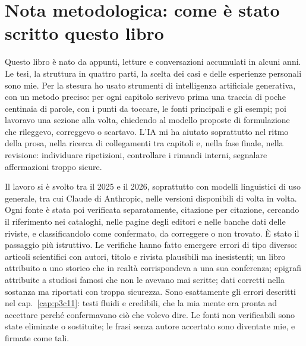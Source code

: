 
\chapter*{Nota metodologica: come è stato scritto questo libro}

Questo libro è nato da appunti, letture e conversazioni accumulati in alcuni anni. Le tesi, la struttura in quattro parti, la scelta dei casi e delle esperienze personali sono mie. Per la stesura ho usato strumenti di intelligenza artificiale generativa, con un metodo preciso: per ogni capitolo scrivevo prima una traccia di poche centinaia di parole, con i punti da toccare, le fonti principali e gli esempi; poi lavoravo una sezione alla volta, chiedendo al modello proposte di formulazione che rileggevo, correggevo o scartavo. L'IA mi ha aiutato soprattutto nel ritmo della prosa, nella ricerca di collegamenti tra capitoli e, nella fase finale, nella revisione: individuare ripetizioni, controllare i rimandi interni, segnalare affermazioni troppo sicure.

Il lavoro si è svolto tra il 2025 e il 2026, soprattutto con modelli linguistici di uso generale, tra cui Claude di Anthropic, nelle versioni disponibili di volta in volta. Ogni fonte è stata poi verificata separatamente, citazione per citazione, cercando il riferimento nei cataloghi, nelle pagine degli editori e nelle banche dati delle riviste, e classificandolo come confermato, da correggere o non trovato. È stato il passaggio più istruttivo. Le verifiche hanno fatto emergere errori di tipo diverso: articoli scientifici con autori, titolo e rivista plausibili ma inesistenti; un libro attribuito a uno storico che in realtà corrispondeva a una sua conferenza; epigrafi attribuite a studiosi famosi che non le avevano mai scritte; dati corretti nella sostanza ma riportati con troppa sicurezza. Sono esattamente gli errori descritti nel cap.~\ref{cap:p3c11}: testi fluidi e credibili, che la mia mente era pronta ad accettare perché confermavano ciò che volevo dire. Le fonti non verificabili sono state eliminate o sostituite; le frasi senza autore accertato sono diventate mie, e firmate come tali.

